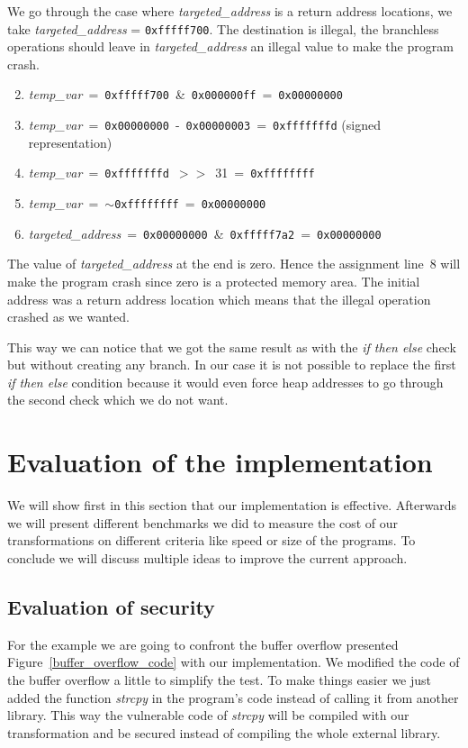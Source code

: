 \documentclass[11pt]{sdm}
\begin{document}
We go through the case where \textit{targeted\_address} is a return address locations, we take \textit{targeted\_address} = \texttt{0xfffff700}. 
The destination is illegal, the branchless operations should leave in \textit{targeted\_address} an illegal value to make the program crash.
\begin{enumerate}[noitemsep]
	\setcounter{enumi}{1}
	\item \textit{temp\_var}~=~\texttt{0xfffff700}~\&~\texttt{0x000000ff}~=~\texttt{0x00000000}
	\item \textit{temp\_var}~=~\texttt{0x00000000}~-~\texttt{0x00000003}~=~\texttt{0xfffffffd} (signed representation)
	\item \textit{temp\_var}~=~\texttt{0xfffffffd}~$>>$~31~=~\texttt{0xffffffff}
	\item \textit{temp\_var}~=~$\sim$\texttt{0xffffffff}~=~\texttt{0x00000000}
	\item \textit{targeted\_address}~=~\texttt{0x00000000}~\&~\texttt{0xfffff7a2}~=~\texttt{0x00000000}
\end{enumerate}
The value of \textit{targeted\_address} at the end is zero. Hence the assignment line~8 will make the program crash since zero is a protected memory area. The initial address was a return address location which means that the illegal operation crashed as we wanted.

This way we can notice that we got the same result as with the \textit{if then else} check but without creating any branch. In our case it is not possible to 
replace the first \textit{if then else} condition because it would even force heap addresses to go through the second check which we do not want.
\newpage

\section{Evaluation of the implementation}
We will show first in this section that our implementation is effective. 
Afterwards we will present different benchmarks we did to measure the cost of our transformations on different criteria like speed or size of the programs.
To conclude we will discuss multiple ideas to improve the current approach.

\subsection{Evaluation of security}
For the example we are going to confront the buffer overflow presented Figure~\ref{buffer_overflow_code} with our implementation. We modified the code of the buffer overflow a little to simplify the test. To make things easier we just added the function \textit{strcpy} in the program's code instead of calling it from another library. This way the vulnerable code of \textit{strcpy} will be compiled with our transformation and be secured instead of compiling the whole external library.
\end{document}

